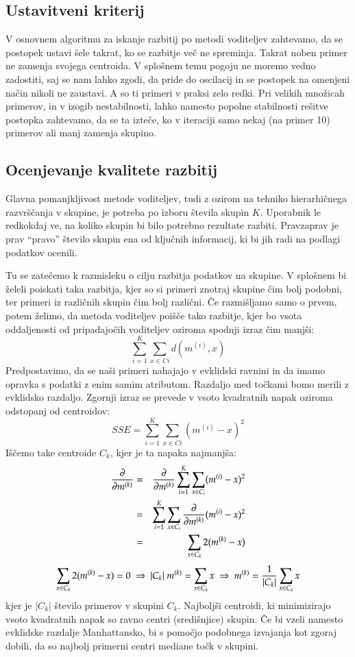 \subsection{Ustavitveni kriterij}

V osnovnem algoritmu za iskanje razbitij po metodi voditeljev
zahtevamo, da se postopek ustavi šele takrat, ko se razbitje več ne
spreminja. Takrat noben primer ne zamenja svojega centroida. V
splošnem temu pogoju ne moremo vedno zadostiti, saj se nam lahko
zgodi, da pride do oscilacij in se postopek na omenjeni način nikoli
ne zaustavi. A so ti primeri v praksi zelo redki. Pri velikih množicah
primerov, in v izogib nestabilnosti, lahko namesto popolne stabilnosti
rešitve postopka zahtevamo, da se ta izteče, ko v iteraciji samo nekaj
(na primer 10) primerov ali manj zamenja skupino.

\subsection{Ocenjevanje kvalitete razbitij}

Glavna pomanjkljivost metode voditeljev, tudi z ozirom na tehniko
hierarhičnega razvrščanja v skupine, je potreba po izboru števila
skupin $K$. Uporabnik le redkokdaj ve, na koliko skupin bi bilo
potrebno rezultate razbiti. Pravzaprav je prav ``pravo'' število
skupin ena od ključnih informacij, ki bi jih radi na podlagi podatkov
ocenili.

Tu se zatečemo k razmisleku o cilju razbitja podatkov na skupine. V
splošnem bi želeli poiskati taka razbitja, kjer so si primeri znotraj
skupine čim bolj podobni, ter primeri iz različnih skupin čim bolj
različni. Če razmišljamo samo o prvem, potem želimo, da metoda
voditeljev poišče tako razbitje, kjer bo vsota oddaljenosti od
pripadajočih voditeljev oziroma spodnji izraz čim manjši:
%
$$ \sum_{i=1}^K \sum_{x\in Ci} d(m^{(i)}, x) $$
%
Predpostavimo, da se naši primeri nahajajo v evklidski ravnini in da imamo opravka s podatki z enim samim atributom. Razdaljo med točkami bomo merili z evklidsko razdaljo. Zgornji izraz se prevede v vsoto kvadratnih napak  oziroma odstopanj od centroidov:
%
$$SSE = \sum_{i=1}^K \sum_{x\in Ci}(m^{(i)}-x)^2$$
%
Iščemo take centroide $C_k$, kjer je ta napaka najmanjša:
\begin{eqnarray}
\frac{\partial}{\partial m^{(k)}} & = & \frac{\partial}{\partial m^{(k)}}\sum_{i=1}^K\sum_{x\in C_i}(m^{(i)}-x)^2  \\
& = & \sum_{i=1}^K\sum_{x\in C_i} \frac{\partial}{\partial m^{(k)}}(m^{(i)}-x)^2 \\
& = & \sum_{x\in C_k} 2 (m^{(k)}-x)
\end{eqnarray}
%
\begin{equation}
\sum_{x\in C_k} 2 (m^{(k)}-x) = 0 \ \Rightarrow \ |C_k|\ m^{(k)} = \sum_{x\in C_k}
  x \ \Rightarrow \ m^{(k)} = {1 \over |C_k|} \sum_{x\in C_k}x
\end{equation}
%
kjer je $|C_k|$ število primerov v skupini $C_k$. Najboljši centroidi,
ki minimizirajo vsoto kvadratnih napak so ravno centri (središnjice)
skupin. Če bi vzeli namesto evklidske razdalje Manhattansko, bi s
pomočjo podobnega izvajanja kot zgoraj dobili, da so najbolj primerni
centri mediane točk v skupini.

